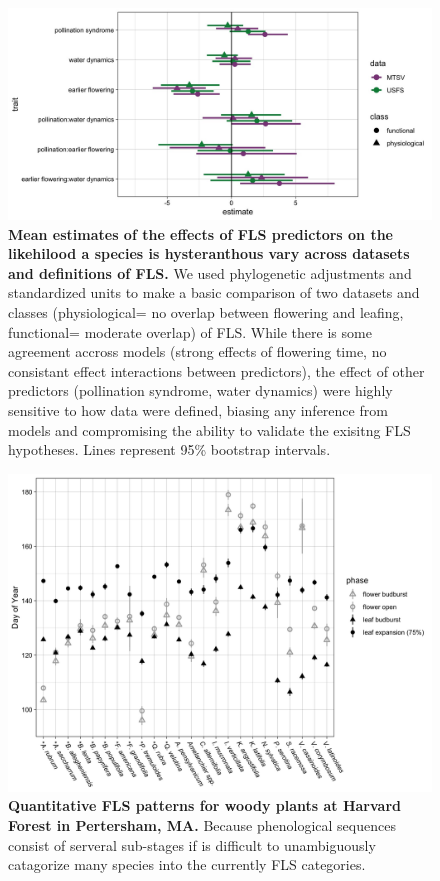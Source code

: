 \documentclass[12pt]{article}\usepackage[]{graphicx}\usepackage[]{color}
\begin{document}
{\begin{figure}[h!]
    \centering
 \includegraphics[width=\textwidth]{..//MTSV_USFS.jpeg} 
    \caption{\textbf{Mean estimates of the effects of FLS predictors on the likehilood a species is hysteranthous vary across datasets and definitions of FLS.}  We used phylogenetic adjustments and standardized units to make a basic comparison of two datasets and classes (physiological= no overlap between flowering and leafing, functional= moderate overlap) of FLS. While there is some agreement accross models (strong effects of flowering time, no consistant effect interactions between predictors), the effect of other predictors (pollination syndrome, water dynamics) were highly sensitive to how data were defined, biasing any inference from models and compromising the ability to validate the exisitng FLS hypotheses. Lines represent 95\% bootstrap intervals.}
    \label{fig:muplots.USMT}
\end{figure}

\begin{figure}[h!]
    \centering
 \includegraphics[width=\textwidth]{..//HarvardForest/HFmeans_expanded.jpeg} 
    \caption{\textbf{Quantitative FLS patterns for woody plants at Harvard Forest in Pertersham, MA.} Because phenological sequences consist of serveral sub-stages if is difficult to unambiguously catagorize many species into the currently FLS categories. }
    \label{fig:HFmeans}
\end{figure}

}
\end{document}
